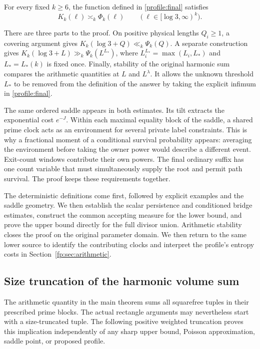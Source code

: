 \begin{theorem}\label{main:uniform}
For every fixed $k\geq6$, the function defined in
\eqref{profile:final} satisfies
\[
 K_k(\ell)\asymp_k\Phi_k(\ell)
 \qquad(\ell\in[\log3,\infty)^k).
\]
\end{theorem}

There are three parts to the proof. On positive physical lengths
$Q_i\geq1$, a covering argument gives
$K_k(\log3+Q)\ll_k\Psi_k(Q)$. A separate construction gives
$K_k(\log3+L)\gg_k\Psi_k(L^{L_*})$, where
$L_i^{L_*}=\max(L_i,L_*)$ and $L_*=L_*(k)$ is fixed once.
Finally, stability of the original harmonic sum compares the arithmetic
quantities at $L$ and $L^\lambda$. It allows the unknown threshold
$L_*$ to be removed from the definition of the answer by taking the
explicit infimum in \eqref{profile:final}.

The same ordered saddle appears in both estimates. Its tilt extracts
the exponential cost $e^{-J}$. Within each maximal equality block of
the saddle, a shared prime clock acts as an environment for several
private label constraints. This is why a fractional moment of a
conditional survival probability appears: averaging the environment
before taking the owner power would describe a different event.
Exit-count windows contribute their own powers. The final ordinary
suffix has one count variable that must simultaneously supply the root
and permit path survival. The proof keeps these requirements together.

The deterministic definitions come first, followed by explicit examples
and the saddle geometry. We then establish the scalar persistence and
conditioned bridge estimates, construct the common accepting measure
for the lower bound, and prove the upper bound directly for the full
divisor union. Arithmetic stability closes the proof on the original
parameter domain. We then return to the same lower source to identify
the contributing clocks and interpret the profile's entropy costs in
Section~\ref{fp:sec:arithmetic}.

\subsection{Size truncation of the harmonic volume sum}
\label{artrunc:section}

The arithmetic quantity in the main theorem sums all squarefree tuples
in their prescribed prime blocks. The actual rectangle arguments may
nevertheless start with a size-truncated tuple. The following positive
weighted truncation proves this implication independently of any sharp
upper bound, Poisson approximation, saddle point, or proposed profile.


